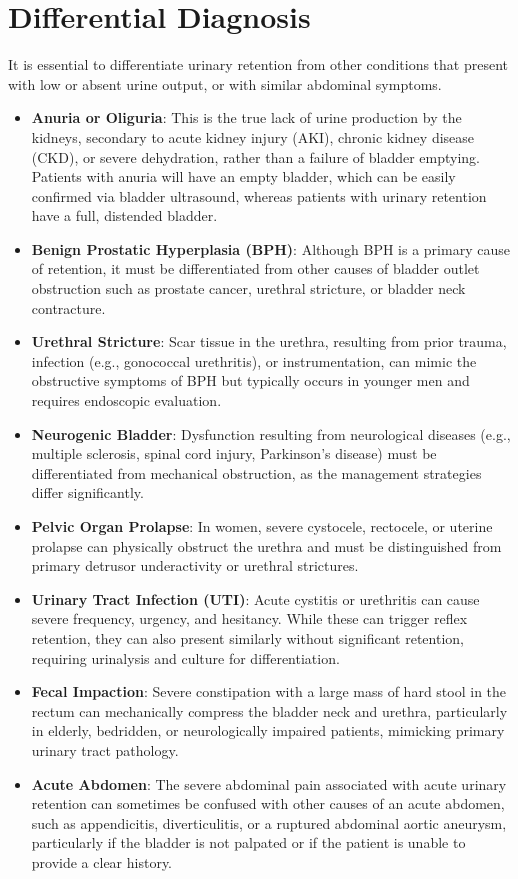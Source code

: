 \section*{Differential Diagnosis}
It is essential to differentiate urinary retention from other conditions that present with low or absent urine output, or with similar abdominal symptoms.
\begin{itemize}
    \item \textbf{Anuria or Oliguria}: This is the true lack of urine production by the kidneys, secondary to acute kidney injury (AKI), chronic kidney disease (CKD), or severe dehydration, rather than a failure of bladder emptying. Patients with anuria will have an empty bladder, which can be easily confirmed via bladder ultrasound, whereas patients with urinary retention have a full, distended bladder.
    \item \textbf{Benign Prostatic Hyperplasia (BPH)}: Although BPH is a primary cause of retention, it must be differentiated from other causes of bladder outlet obstruction such as prostate cancer, urethral stricture, or bladder neck contracture.
    \item \textbf{Urethral Stricture}: Scar tissue in the urethra, resulting from prior trauma, infection (e.g., gonococcal urethritis), or instrumentation, can mimic the obstructive symptoms of BPH but typically occurs in younger men and requires endoscopic evaluation.
    \item \textbf{Neurogenic Bladder}: Dysfunction resulting from neurological diseases (e.g., multiple sclerosis, spinal cord injury, Parkinson's disease) must be differentiated from mechanical obstruction, as the management strategies differ significantly.
    \item \textbf{Pelvic Organ Prolapse}: In women, severe cystocele, rectocele, or uterine prolapse can physically obstruct the urethra and must be distinguished from primary detrusor underactivity or urethral strictures.
    \item \textbf{Urinary Tract Infection (UTI)}: Acute cystitis or urethritis can cause severe frequency, urgency, and hesitancy. While these can trigger reflex retention, they can also present similarly without significant retention, requiring urinalysis and culture for differentiation.
    \item \textbf{Fecal Impaction}: Severe constipation with a large mass of hard stool in the rectum can mechanically compress the bladder neck and urethra, particularly in elderly, bedridden, or neurologically impaired patients, mimicking primary urinary tract pathology.
    \item \textbf{Acute Abdomen}: The severe abdominal pain associated with acute urinary retention can sometimes be confused with other causes of an acute abdomen, such as appendicitis, diverticulitis, or a ruptured abdominal aortic aneurysm, particularly if the bladder is not palpated or if the patient is unable to provide a clear history.
\end{itemize}

